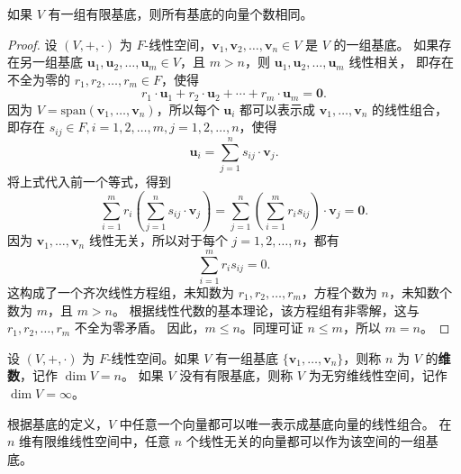 \begin{proposition}
    如果 $ V $ 有一组有限基底，则所有基底的向量个数相同。
\end{proposition}
\begin{proof}
    设 $ (V,+,\cdot) $ 为 $ F $-线性空间，$ \mathbf{v}_1,\mathbf{v}_2,\ldots,\mathbf{v}_n\in V $ 是 $ V $ 的一组基底。
    如果存在另一组基底 $ \mathbf{u}_1,\mathbf{u}_2,\ldots,\mathbf{u}_m\in V $，且 $ m>n $，则 $\mathbf{u}_1,\mathbf{u}_2,\ldots,\mathbf{u}_m$ 线性相关，
    即存在不全为零的 $ r_1,r_2,\ldots,r_m\in F $，使得
    \[
        r_1\cdot \mathbf{u}_1 + r_2\cdot \mathbf{u}_2 + \cdots + r_m\cdot \mathbf{u}_m = \mathbf{0}.
    \]
    因为 $ V=\mathrm{span}(\mathbf{v}_1,\ldots,\mathbf{v}_n) $，所以每个 $\mathbf{u}_i$ 都可以表示成 $\mathbf{v}_1,\ldots,\mathbf{v}_n$ 的线性组合，
    即存在 $ s_{ij}\in F, i=1,2,\ldots,m, j=1,2,\ldots,n $，使得
    \[
        \mathbf{u}_i = \sum_{j=1}^{n} s_{ij}\cdot \mathbf{v}_j.
    \]
    将上式代入前一个等式，得到
    \[
        \sum_{i=1}^{m} r_i \left( \sum_{j=1}^{n} s_{ij}\cdot \mathbf{v}_j \right) = \sum_{j=1}^{n} \left( \sum_{i=1}^{m} r_i s_{ij} \right) \cdot \mathbf{v}_j = \mathbf{0}.
    \]
    因为 $\mathbf{v}_1,\ldots,\mathbf{v}_n$ 线性无关，所以对于每个 $ j=1,2,\ldots,n $，都有
    \[
        \sum_{i=1}^{m} r_i s_{ij} = 0.
    \]
    这构成了一个齐次线性方程组，未知数为 $ r_1,r_2,\ldots,r_m $，方程个数为 $ n $，未知数个数为 $ m $，且 $ m>n $。
    根据线性代数的基本理论，该方程组有非零解，这与 $ r_1,r_2,\ldots,r_m $ 不全为零矛盾。
    因此，$ m\leq n $。同理可证 $ n\leq m $，所以 $ m=n $。
\end{proof}
\vspace{0.5em}

\begin{definition}
    设 $ (V,+,\cdot) $ 为 $ F $-线性空间。如果 $ V $ 有一组基底 $ \{\mathbf{v}_1,\ldots,\mathbf{v}_n\} $，则称 $ n $ 为 $ V $ 的\textbf{维数}，记作 $\dim V = n$。
    如果 $ V $ 没有有限基底，则称 $ V $ 为无穷维线性空间，记作 $\dim V = \infty$。
\end{definition}

\begin{note}
    根据基底的定义，$V$ 中任意一个向量都可以唯一表示成基底向量的线性组合。
    在 $n$ 维有限维线性空间中，任意 $n$ 个线性无关的向量都可以作为该空间的一组基底。
\end{note}
\vspace{1em}




\newpage